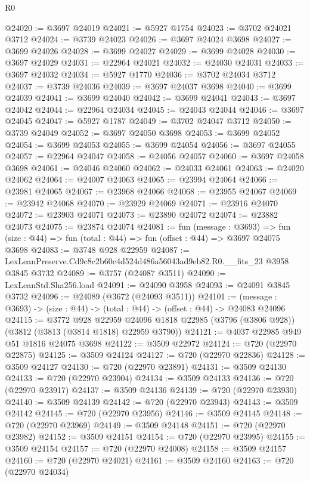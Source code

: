 \begin{lexlean}{R0}
\begin{coremodule}
@24020 := @3697 @24019
@24021 := @5927 @1754
@24023 := @3702 @24021 @3712
@24024 := @3739 @24023
@24026 := @3697 @24024 @3698
@24027 := @3699 @24026
@24028 := @3699 @24027
@24029 := @3699 @24028
@24030 := @3697 @24029
@24031 := @22964 @24021
@24032 := @24030 @24031
@24033 := @3697 @24032
@24034 := @5927 @1770
@24036 := @3702 @24034 @3712
@24037 := @3739 @24036
@24039 := @3697 @24037 @3698
@24040 := @3699 @24039
@24041 := @3699 @24040
@24042 := @3699 @24041
@24043 := @3697 @24042
@24044 := @22964 @24034
@24045 := @24043 @24044
@24046 := @3697 @24045
@24047 := @5927 @1787
@24049 := @3702 @24047 @3712
@24050 := @3739 @24049
@24052 := @3697 @24050 @3698
@24053 := @3699 @24052
@24054 := @3699 @24053
@24055 := @3699 @24054
@24056 := @3697 @24055
@24057 := @22964 @24047
@24058 := @24056 @24057
@24060 := @3697 @24058 @3698
@24061 := @24046 @24060
@24062 := @24033 @24061
@24063 := @24020 @24062
@24064 := @24007 @24063
@24065 := @23994 @24064
@24066 := @23981 @24065
@24067 := @23968 @24066
@24068 := @23955 @24067
@24069 := @23942 @24068
@24070 := @23929 @24069
@24071 := @23916 @24070
@24072 := @23903 @24071
@24073 := @23890 @24072
@24074 := @23882 @24073
@24075 := @23874 @24074
@24081 := fun (message : @3693) =>
  fun (size : @44) => fun (total : @44) => fun (offset : @44) => @3697 @24075 @3698
@24083 := @3748 @928 @22959
@24087 := LexLeanPreserve.Cd9c8c2b60c4d524d486a56043ad9eb82.R0.__fits_23 @3958 @3845 @3732
@24089 := @3757 (@24087 @3511)
@24090 := LexLeanStd.Sha256.load
@24091 := @24090 @3958
@24093 := @24091 @3845 @3732
@24096 := @24089 (@3672 (@24093 @3511))
@24101 := (message : @3693) -> (size : @44) -> (total : @44) -> (offset : @44) -> @24083 @24096
@24115 := @3772
    @928
    @22959
    @24096
    @1818
    @22985
    (@3796 (@3806 @928))
    (@3812 (@3813 (@3814 @1818) @22959 @3790))
@24121 := @4037 @22985 @949 @51 @1816 @24075 @3698
@24122 := @3509 @22972
@24124 := @720 (@22970 @22875)
@24125 := @3509 @24124
@24127 := @720 (@22970 @22836)
@24128 := @3509 @24127
@24130 := @720 (@22970 @23891)
@24131 := @3509 @24130
@24133 := @720 (@22970 @23904)
@24134 := @3509 @24133
@24136 := @720 (@22970 @23917)
@24137 := @3509 @24136
@24139 := @720 (@22970 @23930)
@24140 := @3509 @24139
@24142 := @720 (@22970 @23943)
@24143 := @3509 @24142
@24145 := @720 (@22970 @23956)
@24146 := @3509 @24145
@24148 := @720 (@22970 @23969)
@24149 := @3509 @24148
@24151 := @720 (@22970 @23982)
@24152 := @3509 @24151
@24154 := @720 (@22970 @23995)
@24155 := @3509 @24154
@24157 := @720 (@22970 @24008)
@24158 := @3509 @24157
@24160 := @720 (@22970 @24021)
@24161 := @3509 @24160
@24163 := @720 (@22970 @24034)

\end{coremodule}
\end{lexlean}
